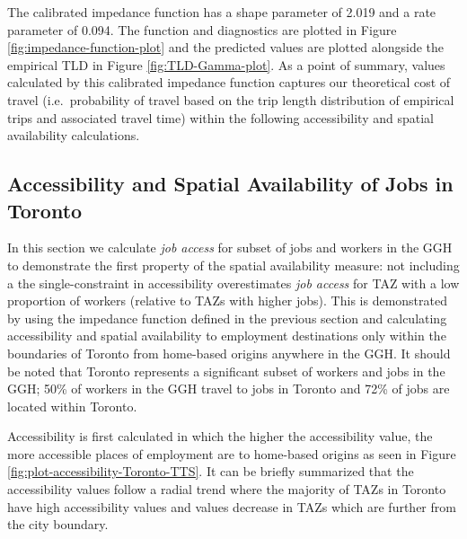 \documentclass[]{elsarticle} %
\begin{document}
The calibrated impedance function has a shape parameter of 2.019 and a
rate parameter of 0.094. The function and diagnostics are plotted in
Figure \ref{fig:impedance-function-plot} and the predicted values are
plotted alongside the empirical TLD in Figure \ref{fig:TLD-Gamma-plot}.
As a point of summary, values calculated by this calibrated impedance
function captures our theoretical cost of travel (i.e.~probability of
travel based on the trip length distribution of empirical trips and
associated travel time) within the following accessibility and spatial
availability calculations.

\hypertarget{accessibility-and-spatial-availability-of-jobs-in-toronto}{%
\subsection{Accessibility and Spatial Availability of Jobs in
Toronto}\label{accessibility-and-spatial-availability-of-jobs-in-toronto}}

In this section we calculate \emph{job access} for subset of jobs and
workers in the GGH to demonstrate the first property of the spatial
availability measure: not including a the single-constraint in
accessibility overestimates \emph{job access} for TAZ with a low
proportion of workers (relative to TAZs with higher jobs). This is
demonstrated by using the impedance function defined in the previous
section and calculating accessibility and spatial availability to
employment destinations only within the boundaries of Toronto from
home-based origins anywhere in the GGH. It should be noted that Toronto
represents a significant subset of workers and jobs in the GGH; 50\% of
workers in the GGH travel to jobs in Toronto and 72\% of jobs are
located within Toronto.

Accessibility is first calculated in which the higher the accessibility
value, the more accessible places of employment are to home-based
origins as seen in Figure \ref{fig:plot-accessibility-Toronto-TTS}. It
can be briefly summarized that the accessibility values follow a radial
trend where the majority of TAZs in Toronto have high accessibility
values and values decrease in TAZs which are further from the city
boundary.
\end{document}
